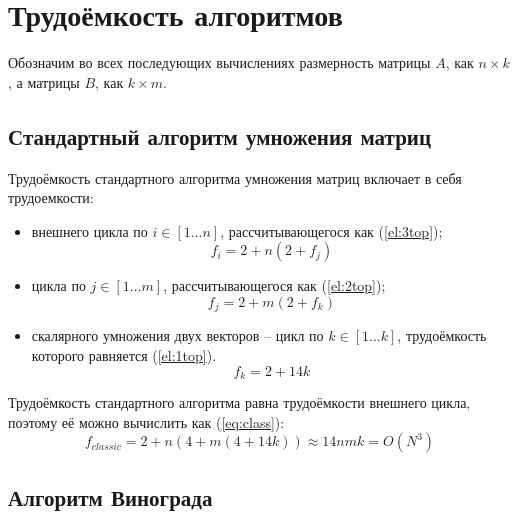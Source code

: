 \section{Трудоёмкость алгоритмов}

Обозначим во всех последующих вычислениях размерность матрицы $A$, как $n \times k$, а матрицы $B$, как $k \times m$.

\subsection{Стандартный алгоритм умножения матриц}

Трудоёмкость стандартного алгоритма умножения матриц включает в себя трудоемкости:
\begin{itemize}
	\item внешнего цикла по $i \in [1 \dots n]$, рассчитывающегося как (\ref{el:3top});
        \begin{equation}
            \label{el:3top}
            f_{i} = 2 + n(2 + f_{j})
        \end{equation}
	\item цикла по $j \in [1 \dots m]$, рассчитывающегося как (\ref{el:2top});
        \begin{equation}
            \label{el:2top}
            f_{j} = 2 + m(2 + f_{k})
        \end{equation}
	\item скалярного умножения двух векторов -- цикл по $k \in [1 \dots k]$, трудоёмкость которого равняется (\ref{el:1top}).
        \begin{equation}
            \label{el:1top}
            f_{k} = 2 + 14k
        \end{equation}
\end{itemize}

Трудоёмкость стандартного алгоритма равна трудоёмкости внешнего цикла, поэтому её можно вычислить как (\ref{eq:class}):
\begin{equation}
	\label{eq:class}
	f_{classic} = 2 + n(4 + m(4 + 14k)) \approx 14nmk = O(N^3)
\end{equation}

\subsection{Алгоритм Винограда}

